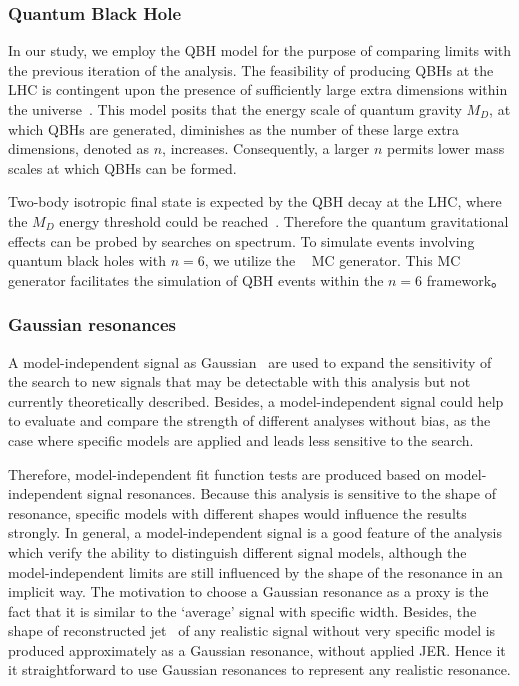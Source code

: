 \subsubsection{Quantum Black Hole}
In our study, we employ the QBH model for the purpose of comparing limits with the previous iteration of the analysis. The feasibility of producing QBHs at the LHC is contingent upon the presence of sufficiently large extra dimensions within the universe~\cite{RandallMeade}. This model posits that the energy scale of quantum gravity $M_{D}$, at which QBHs are generated, diminishes as the number of these large extra dimensions, denoted as $n$, increases. Consequently, a larger $n$ permits lower mass scales at which QBHs can be formed.

Two-body isotropic final state is expected by the QBH decay at the LHC, where the $M_D$ energy threshold could be reached~\cite{Feng:2004}. Therefore the quantum gravitational effects can be probed by searches on \mjj spectrum. To simulate events involving quantum black holes with $n=6$, we utilize the \BlackMax~\cite{Dai:2007ki} MC generator. This MC generator facilitates the simulation of QBH events within the $n=6$ framework。

\subsubsection{Gaussian resonances}

A model-independent signal as Gaussian~\cite{lukacs1942characterization} are used to expand the sensitivity of the search to new signals that may be detectable with this analysis but not currently theoretically described. Besides, a model-independent signal could help to evaluate and compare the strength of different analyses without bias, as the case where specific models are applied and leads less sensitive to the search.

Therefore, model-independent fit function tests are produced based on model-independent signal resonances. Because this analysis is sensitive to the shape of resonance, specific models with different shapes would influence the results strongly. In general, a model-independent signal is a good feature of the analysis which verify the ability to distinguish different signal models, although the model-independent limits are still influenced by the shape of the resonance in an implicit way. The motivation to choose a Gaussian resonance as a proxy is the fact that it is similar to the `average' signal with specific width. Besides, the shape of reconstructed jet \pt~of any realistic signal without very specific model is produced approximately as a Gaussian resonance, without applied JER. Hence it it straightforward to use Gaussian resonances to represent any realistic resonance.

